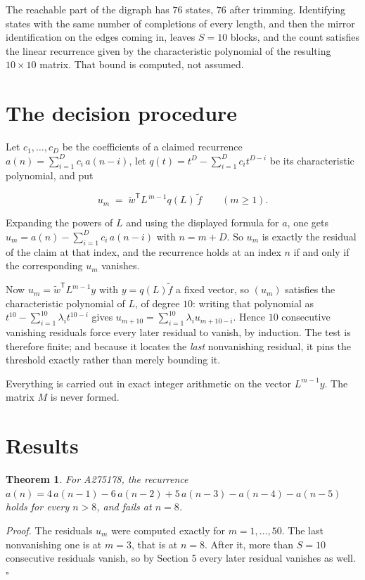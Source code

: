 \documentclass[11pt]{article}
\newtheorem{theorem}{Theorem}
\theoremstyle{definition}
\begin{document}
The reachable part of the digraph has $76$ states, $76$ after trimming. Identifying states with the same number of completions of every length, and then the mirror identification on the edges coming in, leaves $S = 10$ blocks, and the count satisfies the linear recurrence given by the characteristic polynomial of the resulting $10\times10$ matrix. That bound is computed, not assumed.

\section{The decision procedure}

Let $c_1,\dots,c_D$ be the coefficients of a claimed recurrence $a(n) = \sum_{i=1}^{D} c_i\,a(n-i)$, let $q(t) = t^{D} - \sum_{i=1}^{D} c_i t^{D-i}$ be its characteristic polynomial, and put

\[u_m \;=\; \tilde w^{\mathsf T} L^{\,m-1} q(L)\,\tilde f \qquad (m \ge 1).\]

Expanding the powers of $L$ and using the displayed formula for $a$, one gets $u_m = a(n) - \sum_{i=1}^{D} c_i\,a(n-i)$ with $n = m + D$. So $u_m$ is exactly the residual of the claim at that index, and the recurrence holds at an index $n$ if and only if the corresponding $u_m$ vanishes.

Now $u_m = \tilde w^{\mathsf T} L^{m-1} y$ with $y = q(L)\tilde f$ a fixed vector, so $(u_m)$ satisfies the characteristic polynomial of $L$, of degree $10$: writing that polynomial as $t^{10} - \sum_{i=1}^{10} \lambda_i t^{10-i}$ gives $u_{m+10} = \sum_{i=1}^{10} \lambda_i u_{m+10-i}$. Hence $10$ consecutive vanishing residuals force every later residual to vanish, by induction. The test is therefore finite; and because it locates the {\itshape last} nonvanishing residual, it pins the threshold exactly rather than merely bounding it.

Everything is carried out in exact integer arithmetic on the vector $L^{m-1}y$. The matrix $M$ is never formed.

\section{Results}

\begin{theorem} For A275178, the recurrence $a(n) = 4\,a(n-1) - 6\,a(n-2) + 5\,a(n-3) - a(n-4) - a(n-5)$ holds for every $n > 8$, and fails at $n = 8$.\end{theorem}

{\itshape Proof.} The residuals $u_m$ were computed exactly for $m = 1,\dots,50$. The last nonvanishing one is at $m = 3$, that is at $n = 8$. After it, more than $S = 10$ consecutive residuals vanish, so by Section 5 every later residual vanishes as well. $\square$
\end{document}
